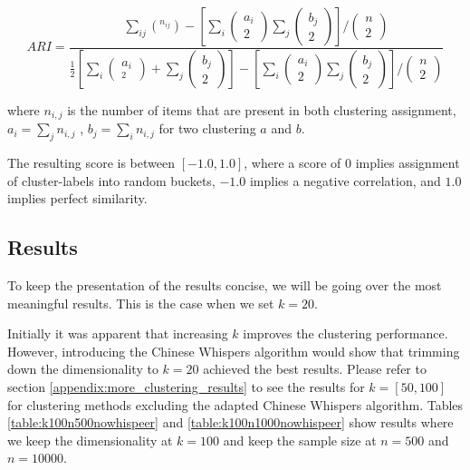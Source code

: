 \documentclass[a4paper,12pt,oneside,openright]{report}
\begin{document}
\begin{equation}
A R I=\frac{\sum_{i j}\left(^{n_{i j}}\right)-\left[\sum_{i}\left(\begin{array}{c}a_{i} \\ 2\end{array}\right) \sum_{j}\left( \begin{array}{c}b_{j} \\ 2\end{array} \right)\right] /\left(\begin{array}{c}n \\ 2\end{array}\right)}{\frac{1}{2}\left[\sum_{i}\left(\begin{array}{c}a_{i} \\ _{2}\end{array}\right)+\sum_{j}\left(\begin{array}{l}b_{j} \\ 2\end{array}\right)\right]-\left[\sum_{i}\left(\begin{array}{c} a_{i} \\ 2\end{array}\right) \sum_{j}\left(\begin{array}{l}b_{j} \\ 2\end{array}\right)\right] /\left(\begin{array}{l}n \\ 2\end{array}\right)}
\end{equation}{\label{eq:adjustedrandomindex}}

where $n_{i,j}$ is the number of items that are present in both clustering assignment, $a_i = \sum_j n_{i,j}$ , $b_j = \sum_i n_{i,j}$ for two clustering $a$ and $b$.

The resulting score is between $[-1.0, 1.0]$, where a score of $0$ implies assignment of cluster-labels into random buckets, $-1.0$ implies a negative correlation, and $1.0$ implies perfect similarity.

\subsection{Results}

To keep the presentation of the results concise, we will be going over the most meaningful results.
This is the case when we set $k=20$.

Initially it was apparent that increasing $k$ improves the clustering performance.
However, introducing the Chinese Whispers algorithm would show that trimming down the dimensionality to $k=20$ achieved the best results.
Please refer to section \ref{appendix:more_clustering_results} to see the results for $k=[50, 100]$ for clustering methods excluding the adapted Chinese Whispers algorithm.
Tables \ref{table:k100n500nowhispeer} and \ref{table:k100n1000nowhispeer} show results where we keep the dimensionality at $k=100$ and keep the sample size at $n=500$ and $n=10000$. 
\end{document}
